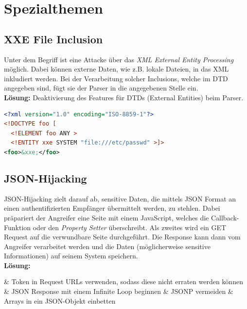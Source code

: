 \section{Spezialthemen}


\subsection{XXE File Inclusion}
Unter dem Begriff ist eine Attacke über das \textit{XML External Entity Processing} möglich. Dabei können externe Daten, wie z.B. lokale Dateien, in das XML inkludiert werden. Bei der Verarbeitung solcher Inclusions, welche im DTD angegeben sind, fügt sie der Parser in die angegebenen Stelle ein.\\

\textbf{Lösung:} Deaktivierung des Features für DTDs (External Entities) beim Parser.

\begin{lstlisting}[language=XML, caption=Beispiel der XXE]
<?xml version="1.0" encoding="ISO-8859-1"?>
<!DOCTYPE foo [  
  <!ELEMENT foo ANY >
  <!ENTITY xxe SYSTEM "file:///etc/passwd" >]>
<foo>&xxe;</foo>
\end{lstlisting}

\subsection{JSON-Hijacking}
JSON-Hijacking zielt darauf ab, sensitive Daten, die mittels JSON Format an einen authentifizierten Empfänger übermittelt werden, zu stehlen. Dabei präpariert der Angreifer eine Seite mit einem JavaScript, welches die Callback-Funktion oder den \textit{Property Setter} überschreibt. Als zweites wird ein GET Request auf die verwundbare Seite durchgeführt. Die Response kann dann vom Angreifer verarbeitet werden und die Daten (möglicherweise sensitive Informationen) auf seinem System speichern.\\

\textbf{Lösung:}
\begin{easylist}
	& Token in Request URLs verwenden, sodass diese nicht erraten werden können
	& JSON Response mit einem Infinite Loop beginnen
	& JSONP vermeiden
	& Arrays in ein JSON-Objekt einbetten
\end{easylist} 

